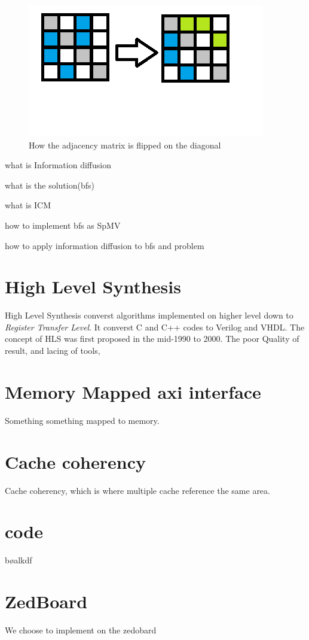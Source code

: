\begin{figure}
\includegraphics{Figures/flip_matrix}
\caption{How the adjacency matrix is flipped on the diagonal}
\label{fig:flipDiagonal}

\end{figure}



\begin{list}{1}
\item what is Information diffusion
\item what is the solution(bfs)
\item what is ICM
\item how to implement bfs as SpMV
\item how to apply information diffusion to bfs and problem
\item 
\end{list}


\section{High Level Synthesis}
\cite{HLSTutorial}
High Level Synthesis converst algorithms implemented on higher level down to \textit{Register Transfer Level}. It converst C and C++ codes to Verilog and VHDL. The concept of HLS was first proposed in the mid-1990 to 2000\cite{HLSTutorial}. The poor Quality of result, and lacing of tools,


\section{Memory Mapped axi interface}
Something something mapped to memory.

\section{Cache coherency }
Cache coherency, which is where multiple cache reference the same area.

\section{code}
bøalkdf


\section{ZedBoard}

We choose to implement on the zedobard